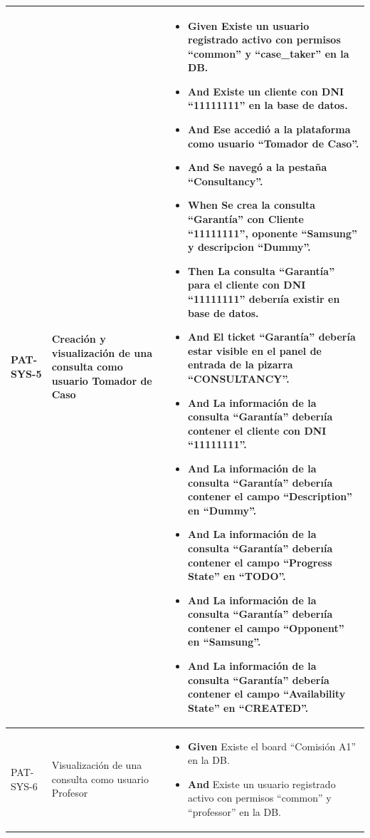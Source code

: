 \begin{longtable}{|p{1cm}|p{2.5cm}|p{12cm}|}
    \hline
    PAT-SYS-5 & Creación y visualización de una consulta como usuario Tomador de Caso & 
    \begin{itemize}
        \item \textbf{Given} Existe un usuario registrado activo con permisos ``common'' y ``case\_taker'' en la DB.
        \item \textbf{And} Existe un cliente con DNI ``11111111'' en la base de datos.
        \item \textbf{And} Ese accedió a la plataforma como usuario ``Tomador de Caso''.
        \item \textbf{And} Se navegó a la pestaña ``Consultancy''.
        \newline
        \item \textbf{When} Se crea la consulta ``Garantía'' con Cliente ``11111111'', oponente ``Samsung'' y descripcion ``Dummy''.
        \newline
        \item \textbf{Then} La consulta ``Garant\'ia'' para el cliente con DNI ``11111111'' deberı\'ia existir en base de datos.
        \item \textbf{And} El ticket ``Garant\'ia'' deber\'ia estar visible en el panel de entrada de la pizarra ``CONSULTANCY''.
        \item \textbf{And} La información de la consulta ``Garant\'ia'' deberı\'ia contener el cliente con DNI ``11111111''.
        \item \textbf{And} La información de la consulta ``Garant\'ia'' deberı\'ia contener el campo ``Description'' en ``Dummy''.
        \item \textbf{And} La información de la consulta ``Garant\'ia'' deberı\'ia contener el campo ``Progress State'' en ``TODO''.
        \item \textbf{And} La información de la consulta ``Garant\'ia'' deberı\'ia contener el campo ``Opponent'' en ``Samsung''.
        \item \textbf{And} La información de la consulta ``Garant\'ia'' deber\'ia contener el campo ``Availability State'' en ``CREATED''.
    \end{itemize}
    \\
    \hline
    PAT-SYS-6 & Visualización de una consulta como usuario Profesor & 
        \begin{itemize}
        \item \textbf{Given} Existe el board ``Comisión A1'' en la DB.
        \item \textbf{And} Existe un usuario registrado activo con permisos ``common'' y ``professor'' en la DB.

\end{itemize}
\end{longtable}
